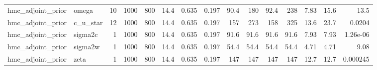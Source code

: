 \begin{tabular}{llrrrrrrrrrrrrr}
hmc_adjoint_prior & omega & 10 & 1000 & 800 & 14.4 & 0.635 & 0.197 & 90.4 & 180 & 92.4 & 238 & 7.83 & 15.6 & 13.5 \\
hmc_adjoint_prior & c_u_star & 12 & 1000 & 800 & 14.4 & 0.635 & 0.197 & 157 & 273 & 158 & 325 & 13.6 & 23.7 & 0.0204 \\
hmc_adjoint_prior & sigma2c & 1 & 1000 & 800 & 14.4 & 0.635 & 0.197 & 91.6 & 91.6 & 91.6 & 91.6 & 7.93 & 7.93 & 1.26e-06 \\
hmc_adjoint_prior & sigma2w & 1 & 1000 & 800 & 14.4 & 0.635 & 0.197 & 54.4 & 54.4 & 54.4 & 54.4 & 4.71 & 4.71 & 9.08 \\
hmc_adjoint_prior & zeta & 1 & 1000 & 800 & 14.4 & 0.635 & 0.197 & 147 & 147 & 147 & 147 & 12.7 & 12.7 & 0.000245 \\
\bottomrule
\end{tabular}
